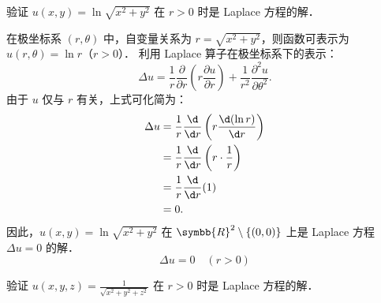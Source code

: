 \begin{solution}
     验证 $u(x,y) = \ln \sqrt{x^2 + y^2}$ 在 $r>0$ 时是 Laplace 方程的解．

    在极坐标系 $(r, \theta)$ 中，自变量关系为 $r = \sqrt{x^2+y^2}$，则函数可表示为 $u(r, \theta) = \ln r$（$r>0$）．
    利用 Laplace 算子在极坐标系下的表示：
    \begin{equation}
        \Delta u = \frac{1}{r} \frac{\partial}{\partial r} \left( r \frac{\partial u}{\partial r} \right) + \frac{1}{r^2} \frac{\partial^2 u}{\partial \theta^2}.
    \end{equation}
    由于 $u$ 仅与 $r$ 有关，上式可化简为：
    \begin{equation}
        \begin{aligned}
            \Delta u & = \frac{1}{r} \frac{\d}{\d r} \left( r \frac{\d(\ln r)}{\d r} \right) \\
                     & = \frac{1}{r} \frac{\d}{\d r} \left( r \cdot \frac{1}{r} \right)      \\
                     & = \frac{1}{r} \frac{\d}{\d r} (1)                                     \\
                     & = 0.
        \end{aligned}
    \end{equation}
    因此，$u(x,y) = \ln \sqrt{x^2 + y^2}$ 在 $\symbb{R}^2\setminus\{(0,0)\}$ 上是 Laplace 方程 $\Delta u = 0$ 的解．
    \begin{equation}
        \boxed{\Delta u = 0 \quad (r>0)}
    \end{equation}

     验证 $u(x,y,z) = \frac{1}{\sqrt{x^2+y^2+z^2}}$ 在 $r>0$ 时是 Laplace 方程的解．


\end{solution}
